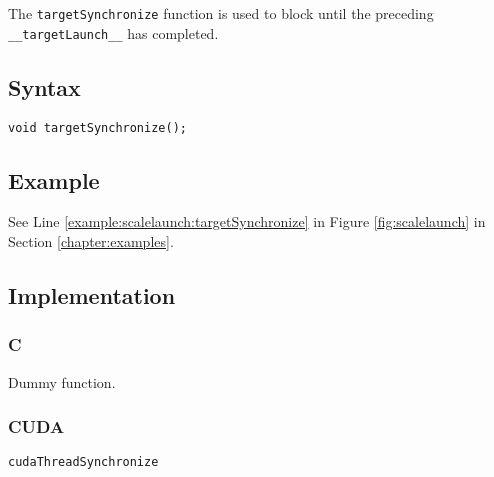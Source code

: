 The \verb+targetSynchronize+ function is used to block until the preceding \verb+__targetLaunch__+ has completed.

\subsection{Syntax}
\begin{verbatim}
void targetSynchronize();
\end{verbatim}

\subsection{Example}
See Line \ref{example:scalelaunch:targetSynchronize} in Figure \ref{fig:scalelaunch} in Section \ref{chapter:examples}.
\subsection{Implementation}
\subsubsection{C}
Dummy function.
\subsubsection{CUDA}
\verb+cudaThreadSynchronize+







